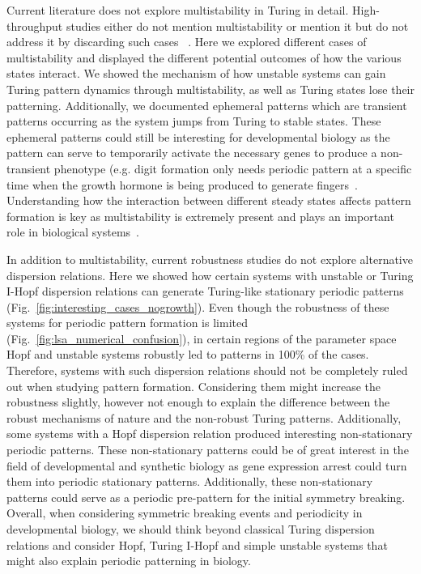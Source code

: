 Current literature does not explore multistability in Turing in detail.
High-throughput studies either do not mention multistability or mention it but do not address it by discarding such cases ~\parencite{Scholes2019, Marcon, Zheng2016}.
Here we explored different cases of multistability and displayed the different potential outcomes of how the various states interact.
We showed the mechanism of how unstable systems can gain Turing pattern dynamics through multistability, as well as Turing states lose their patterning.
Additionally, we documented ephemeral patterns which are transient patterns occurring as the system jumps from Turing to stable states.
These ephemeral patterns could still be interesting for developmental biology as the pattern can serve to temporarily activate the necessary genes to produce a non-transient phenotype (e.g. digit formation only needs periodic pattern at a specific time when the growth hormone is being produced to generate fingers~\parencite{Raspopovic1}.
Understanding how the interaction between different steady states affects pattern formation is key as multistability is extremely present and plays an important role in biological systems~\parencite{laurent1999multistability}.

In addition to multistability, current robustness studies do not explore alternative dispersion relations.
Here we showed how certain systems with unstable or Turing I-Hopf dispersion relations can generate Turing-like stationary periodic patterns (Fig.~\ref{fig:interesting_cases_nogrowth}).
Even though the robustness of these systems for periodic pattern formation is limited (Fig.~\ref{fig:lsa_numerical_confusion}), in certain regions of the parameter space Hopf and unstable systems robustly led to patterns in 100\% of the cases.
Therefore, systems with such dispersion relations should not be completely ruled out when studying pattern formation.
Considering them might increase the robustness slightly, however not enough to explain the difference between the robust mechanisms of nature and the non-robust Turing patterns.
Additionally, some systems with a Hopf dispersion relation produced interesting non-stationary periodic patterns.
These non-stationary patterns could be of great interest in the field of developmental and synthetic biology as gene expression arrest could turn them into periodic stationary patterns.
Additionally, these non-stationary patterns could serve as a periodic pre-pattern for the initial symmetry breaking.
Overall, when considering symmetric breaking events and periodicity in developmental biology, we should think beyond classical Turing dispersion relations and consider Hopf, Turing I-Hopf and simple unstable systems that might also explain periodic patterning in biology.

